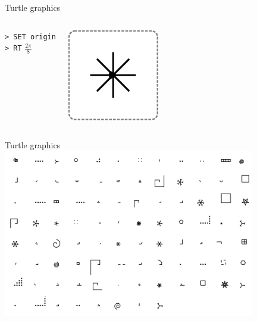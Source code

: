 \documentclass{beamer}
\begin{document}
\begin{frame}{Turtle graphics}
{\begin{columns}[T]
\begin{mycode}
          \texttt{> SET origin} \\
          \texttt{> RT} $\frac{2\pi}{8}$\\
          \vspace*{2\baselineskip}
        \end{mycode}
        \includegraphics[width = 4cm]{figures/teachLogo/star.eps}
    \end{columns}
  }
\end{frame}

\begin{frame}{Turtle graphics}
  \centering
  \includegraphics[width=11cm]{figures/tasksMinusBehaviour.png}
\end{frame}
\end{document}
